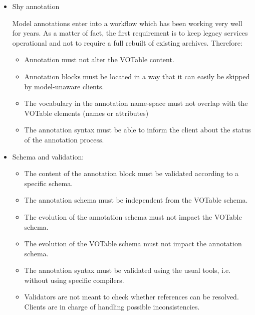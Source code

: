 \begin {itemize}
  \item Shy annotation %
  
  	Model annotations enter into a workflow which has been working very well for years. As a matter of fact, the first requirement is to keep 
	legacy services operational and not to require a full rebuilt of existing archives. Therefore: 
	
  \begin {itemize}
    \item Annotation must not alter the VOTable content.
    \item Annotation blocks must be located in a way that it can easily be skipped by model-unaware clients.
    \item The vocabulary in the annotation name-space must not overlap with the VOTable elements (names or attributes)    
    \item The annotation syntax must be able to inform the client about the status of the annotation process.
  \end {itemize}
  
  \item Schema and validation:
  \begin {itemize}
     \item The content of the annotation block must be validated according to a specific schema.
    \item The annotation schema must be independent from the VOTable schema.
    \item The evolution of the annotation schema must not impact the VOTable schema.
    \item The evolution of the VOTable schema must not impact the annotation schema.
    \item The annotation syntax must be validated using the usual tools, i.e. without using specific compilers.
    \item Validators are not meant to check whether references can be resolved. Clients are in charge of handling possible inconsistencies.
  \end {itemize}
  

\end{itemize}
